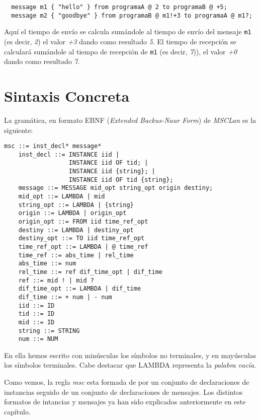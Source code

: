 \begin{itemize}
  \begin{lstlisting}
  message m1 { "hello" } from programaA @ 2 to programaB @ +5;
  message m2 { "goodbye" } from programaB @ m1!+3 to programaA @ m1?;
  \end{lstlisting}

  Aquí el tiempo de envío se calcula sumándole al tiempo de envío del
  mensaje \lstinline{m1} (es decir, \textit{2}) el valor \textit{+3}
  dando como resultado \textit{5}. El tiempo de recepción se calculará
  sumándole al tiempo de recepción de \lstinline{m1} (es decir,
  \textit{7})), el valor \textit{+0} dando como resultado \textit{7}.
\end{itemize}


\section{Sintaxis Concreta}

La gramática, en formato EBNF (\emph{Extended Backus-Naur Form}) de
\textit{MSCLan} es la siguiente:
\begin{lstlisting}[style=spec, language={}]
    msc ::= inst_decl* message*
    inst_decl ::= INSTANCE iid |
                  INSTANCE iid OF tid; |
                  INSTANCE iid {string}; |
                  INSTANCE iid OF tid {string};               
    message ::= MESSAGE mid_opt string_opt origin destiny;
    mid_opt ::= LAMBDA | mid
    string_opt ::= LAMBDA | {string}
    origin ::= LAMBDA | origin_opt
    origin_opt ::= FROM iid time_ref_opt
    destiny ::= LAMBDA | destiny_opt
    destiny_opt ::= TO iid time_ref_opt
    time_ref_opt ::= LAMBDA | @ time_ref
    time_ref ::= abs_time | rel_time
    abs_time ::= num
    rel_time ::= ref dif_time_opt | dif_time
    ref ::= mid ! | mid ?
    dif_time_opt ::= LAMBDA | dif_time
    dif_time ::= + num | - num
    iid ::= ID
    tid ::= ID
    mid ::= ID
    string ::= STRING
    num ::= NUM
\end{lstlisting}

En ella hemos escrito con minúsculas los símbolos no terminales, y en 
mayúsculas los símbolos terminales. Cabe destacar que LAMBDA
representa la \textit{palabra vacía}.

Como vemos, la regla \textit{msc} esta formada de por un conjunto de
declaraciones de instancias seguido de un conjunto de declaraciones de
mensajes. Los distintos formatos de intancias y mensajes ya han sido
explicados anteriormente en este capítulo.

